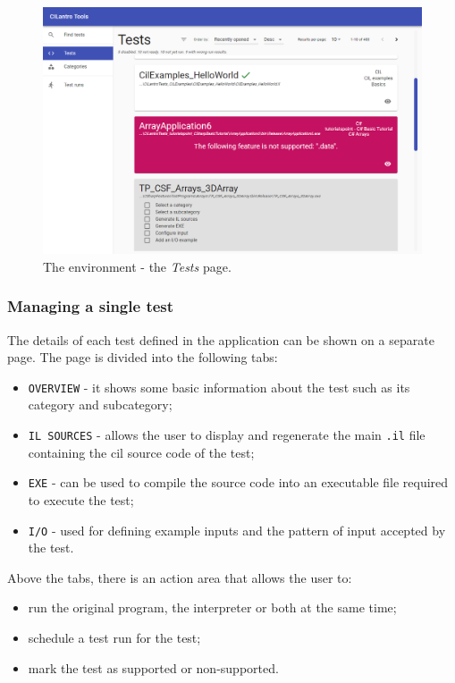 \documentclass{article}
\numberwithin{equation}{section}
\begin{document}
\begin{figure}
	\includegraphics[width=1\textwidth]{tools_tests.png}
    \centering
    \caption{The environment - the \textit{Tests} page.}
    \label{fig:tools_tests}
\end{figure}

\subsubsection{Managing a single test}

The details of each test defined in the application can be shown on a separate page. The page is divided into the following tabs:
\begin{itemize}
	\item{\texttt{OVERVIEW} - it shows some basic information about the test such as its category and subcategory};
	\item{\texttt{IL SOURCES} - allows the user to display and regenerate the main \texttt{.il} file containing the \acrshort{cil} source code of the test};
	\item{\texttt{EXE} - can be used to compile the source code into an executable file required to execute the test};
	\item{\texttt{I/O} - used for defining example inputs and the pattern of input accepted by the test}.
\end{itemize}

Above the tabs, there is an action area that allows the user to:
\begin{itemize}
	\item{run the original program, the interpreter or both at the same time};
	\item{schedule a test run for the test};
	\item{mark the test as supported or non-supported}.
\end{itemize}
\end{document}
